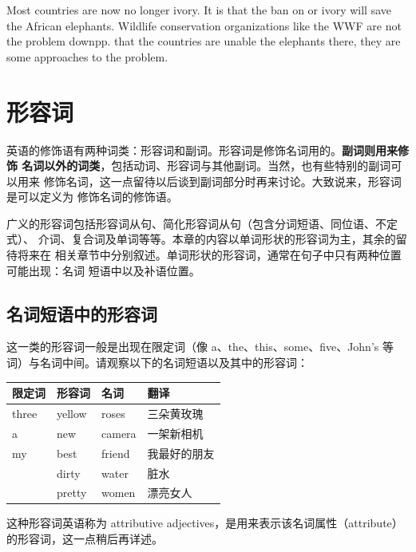 Most countries are now no longer  ivory. It is 
that the ban on  or  ivory will save the
 African elephants. Wildlife conservation organizations like
the WWF are not  the problem  down{pp}. 
that the  countries are unable  the
elephants there, they are  some 
approaches to  the problem.

\chapter{形容词}

英语的修饰语有两种词类：形容词和副词。形容词是修饰名词用的。\textbf{副词则用来修饰
  名词以外的词类}，包括动词、形容词与其他副词。当然，也有些特别的副词可以用来
修饰名词，这一点留待以后谈到副词部分时再来讨论。大致说来，形容词是可以定义为
修饰名词的修饰语。

广义的形容词包括形容词从句、简化形容词从句（包含分词短语、同位语、不定式）、
介词、复合词及单词等等。本章的内容以单词形状的形容词为主，其余的留待将来在
相关章节中分别叙述。单词形状的形容词，通常在句子中只有两种位置可能出现：名词
短语中以及补语位置。

\section{名词短语中的形容词}

这一类的形容词一般是出现在限定词（像 a、the、this、some、five、John's
等词）与名词中间。请观察以下的名词短语以及其中的形容词：

\begin{longtable}[]{@{}llll@{}}
  \toprule\noalign{}
  限定词 & 形容词 & 名词 & 翻译 \\
  \midrule\noalign{}
  \endhead
  \bottomrule\noalign{}
  \endlastfoot
  three & yellow & roses & 三朵黄玫瑰 \\
  a & new & camera & 一架新相机 \\
  my & best & friend & 我最好的朋友 \\
         & dirty & water & 脏水 \\
         & pretty & women & 漂亮女人 \\
\end{longtable}

这种形容词英语称为 attributive adjectives，是用来表示该名词属性（attribute）
的形容词，这一点稍后再详述。


